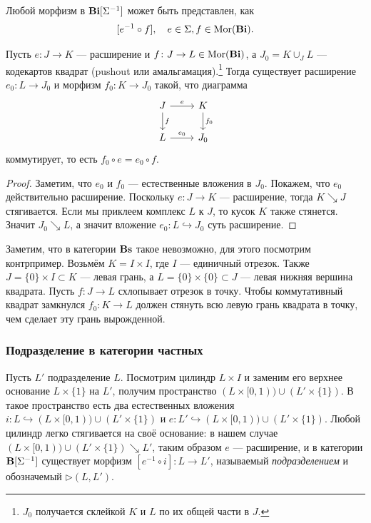 \documentclass[10pt, twoside]{article}
\begin{document}
\begin{proposition}
    Любой морфизм в $\mathbf{Bi}[\Sigma^{-1}]$ может быть представлен, как $$[e^{-1}\circ f], \quad e \in \Sigma, f \in \operatorname{Mor}(\mathbf{Bi}).$$
\end{proposition}

\begin{lemma}
    Пусть $e \colon J \to K$ --- расширение и $f \colon J \to L \in \operatorname{Mor}(\mathbf{Bi})$, а $J_0 = K \cup_{J} L$ --- кодекартов квадрат (pushout или амальгамация).\footnote{$J_0$ получается склейкой $K$ и $L$ по их общей части в $J$.} Тогда существует расширение $e_0 \colon L \to J_0$ и морфизм $f_0 \colon K \to J_0$ такой, что диаграмма
    \begin{equation}
        \begin{tikzcd}
            J \rar["e"] \dar["f"] & K \dar["f_0"] \\
            L \rar["e_0"] & J_0
        \end{tikzcd}
    \end{equation}
    коммутирует, то есть $f_0 \circ e = e_0 \circ f.$
\end{lemma}
\begin{proof}
    Заметим, что $e_0$ и $f_0$ --- естественные вложения в $J_0$. Покажем, что $e_0$ действительно расширение. Поскольку $e\colon J \to K$ --- расширение, тогда $K \searrow J$ стягивается. Если мы приклеем комплекс $L$ к $J$, то  кусок $K$ также стянется. Значит $J_0 \searrow L$, а значит вложение $e_0 \colon L \hookrightarrow J_0$ суть расширение.
\end{proof}
Заметим, что в категории $\mathbf{Bs}$ такое невозможно, для этого посмотрим контрпример. Возьмём $K = I \times I$, где $I$ --- единичный отрезок. Также $J = \{0\} \times I \subset K$ --- левая грань, а $L = \{0\} \times \{0\} \subset J$ --- левая нижняя вершина квадрата. Пусть $f \colon J \to L$ схлопывает отрезок в точку. Чтобы коммутативный квадрат замкнулся $f_0 \colon K \to L$ должен стянуть всю левую грань квадрата в точку, чем сделает эту грань вырожденной.

\subsubsection{Подразделение в категории частных}
Пусть $L'$ подразделение $L$. Посмотрим цилиндр $L \times I$ и заменим его верхнее основание $L \times \{1\}$ на $L'$, получим пространство $(L\times [0, 1)) \cup (L' \times \{1\})$. В такое пространство есть два естественных вложения $i \colon L \hookrightarrow (L\times [0, 1)) \cup (L' \times \{1\})$ и $e \colon L' \hookrightarrow (L\times [0, 1)) \cup (L' \times \{1\})$. Любой цилиндр легко стягивается на своё основание: в нашем случае $(L\times [0, 1)) \cup (L' \times \{1\}) \searrow L'$, таким образом $e$ --- расширение, и в категории $\mathbf{B}[\Sigma^{-1}]$ существует морфизм $[e^{-1} \circ i] \colon L \to L'$, называемый \emph{подразделением} и обозначемый $\triangleright(L, L')$.
\end{document}
